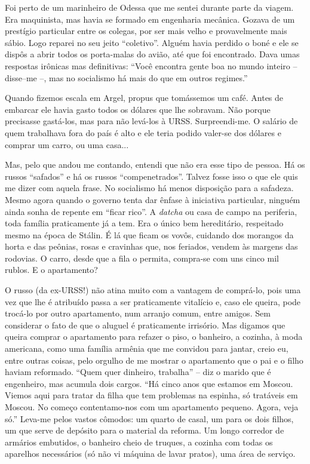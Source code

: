 Foi perto de um marinheiro de Odessa que me sentei durante parte da
viagem. Era maquinista, mas havia se formado em engenharia mecânica.
Gozava de um prestígio particular entre os colegas, por ser mais velho e
provavelmente mais sábio. Logo reparei no seu jeito ``coletivo''. Alguém
havia perdido o boné e ele se dispôs a abrir todos os porta-malas do
avião, até que foi encontrado. Dava umas respostas irônicas mas
definitivas: ``Você encontra gente boa no mundo inteiro -- disse--me --,
mas no socialismo há mais do que em outros regimes.''

Quando fizemos escala em Argel, propus que tomássemos um café. Antes de
embarcar ele havia gasto todos os dólares que lhe sobravam. Não porque
precisasse gastá-los, mas para não levá-los à URSS. Surpreendi-me. O
salário de quem trabalhava fora do país é alto e ele teria podido
valer-se dos dólares e comprar um carro, ou uma casa...

Mas, pelo que andou me contando, entendi que não era esse tipo de
pessoa. Há os russos ``safados'' e há os russos ``compenetrados''.
Talvez fosse isso o que ele quis me dizer com aquela frase. No
socialismo há menos disposição para a safadeza. Mesmo agora quando o
governo tenta dar ênfase à iniciativa particular, ninguém ainda sonha de
repente em ``ficar rico''. A \emph{datcha} ou casa de campo na
periferia, toda família praticamente já a tem. Era o único bem
hereditário, respeitado mesmo na época de Stálin. É lá que ficam os
vovôs, cuidando dos morangos da horta e das peônias, rosas e cravinhas
que, nos feriados, vendem às margens das rodovias. O carro, desde que a
fila o permita, compra-se com uns cinco mil rublos. E o apartamento?

O russo (da ex-URSS!) não atina muito com a vantagem de comprá-lo, pois
uma vez que lhe é atribuído passa a ser praticamente vitalício e, caso
ele queira, pode trocá-lo por outro apartamento, num arranjo comum,
entre amigos. Sem considerar o fato de que o aluguel é praticamente
irrisório. Mas digamos que queira comprar o apartamento para refazer o
piso, o banheiro, a cozinha, à moda americana, como uma família armênia
que me convidou para jantar, creio eu, entre outras coisas, pelo orgulho
de me mostrar o apartamento que o pai e o filho haviam reformado. ``Quem
quer dinheiro, trabalha'' -- diz o marido que é engenheiro, mas acumula
dois cargos. ``Há cinco anos que estamos em Moscou. Viemos aqui para
tratar da filha que tem problemas na espinha, só tratáveis em Moscou. No
começo contentamo-nos com um apartamento pequeno. Agora, veja só.''
Leva-me pelos vastos cômodos: um quarto de casal, um para os dois
filhos, um que serve de depósito para o material da reforma. Um longo
corredor de armários embutidos, o banheiro cheio de truques, a cozinha
com todas os aparelhos necessários (só não vi máquina de lavar pratos),
uma área de serviço.

